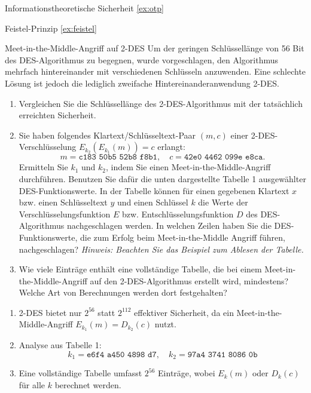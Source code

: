 \documentclass{article}
\begin{document}
\setcounter{subsection}{30}
\begin{exercise}{Informationstheoretische Sicherheit \ref{ex:otp}}\end{exercise}

\begin{exercise}{Feistel-Prinzip \ref{ex:feistel}}\end{exercise}

\begin{exercise}{Meet-in-the-Middle-Angriff auf 2-DES}
  Um der geringen Schlüssellänge von 56 Bit des DES-Algorithmus zu begegnen, wurde vorgeschlagen, den Algorithmus mehrfach hintereinander mit verschiedenen Schlüsseln anzuwenden. Eine schlechte Lösung ist jedoch die lediglich zweifache Hintereinanderanwendung 2-DES.
  \begin{enumerate}
    \item Vergleichen Sie die Schlüssellänge des 2-DES-Algorithmus mit der tatsächlich erreichten Sicherheit.
    \item Sie haben folgendes Klartext/Schlüsseltext-Paar $ (m, c) $ einer 2-DES-Verschlüsselung $ E_{k_2}(E_{k_1}(m)) = c $ erlangt: 
      \[ m = \texttt{c183 50b5 52b8 f8b1}, \quad c = \texttt{42e0 4462 099e e8ca}. \]
      Ermitteln Sie $ k_1 $ und $ k_2 $, indem Sie einen Meet-in-the-Middle-Angriff durchführen. Benutzen Sie dafür die unten dargestellte Tabelle 1 ausgewählter DES-Funktionswerte. In der Tabelle können für einen gegebenen Klartext $ x $ bzw. einen Schlüsseltext $ y $ und einen Schlüssel $ k $ die Werte der Verschlüsselungsfunktion $ E $ bzw. Entschlüsselungsfunktion $ D $ des DES-Algorithmus nachgeschlagen werden. In welchen Zeilen haben Sie die DES-Funktionswerte, die zum Erfolg beim Meet-in-the-Middle Angriff führen, nachgeschlagen?
      \textit{Hinweis: Beachten Sie das Beispiel zum Ablesen der Tabelle.}
      
    \item Wie viele Einträge enthält eine vollständige Tabelle, die bei einem Meet-in-the-Middle-Angriff auf den 2-DES-Algorithmus erstellt wird, mindestens? Welche Art von Berechnungen werden dort festgehalten?
  \end{enumerate}

  \begin{solution}
    \begin{enumerate}
        \item 2-DES bietet nur $ 2^{56} $ statt $ 2^{112} $ effektiver Sicherheit, da ein Meet-in-the-Middle-Angriff $ E_{k_1}(m) = D_{k_2}(c) $ nutzt.
        \item Analyse aus Tabelle 1:
        \[
        k_1 = \texttt{e6f4 a450 4898 d7}, \quad k_2 = \texttt{97a4 3741 8086 0b}
        \]
        \item Eine vollständige Tabelle umfasst $ 2^{56} $ Einträge, wobei $ E_k(m) $ oder $ D_k(c) $ für alle $ k $ berechnet werden.
    \end{enumerate}
  \end{solution}
\end{exercise}
\end{document}
